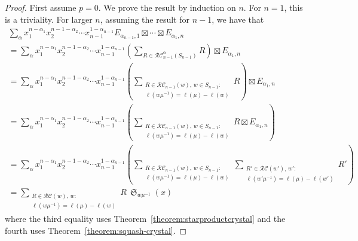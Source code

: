 \documentclass{amsart}
\theoremstyle{definition}
\theoremstyle{remark}
\numberwithin{equation}{section}
\DeclareMathOperator{\sch}{\mathfrak{S}}
\newcommand{\RC}{\mathcal{RC}}
\begin{document}
\begin{proof}
First assume $p=0$. We prove the result by induction on $n$. For $n=1$, this is a triviality. For larger $n$, assuming the result for $n-1$, we have that
\begin{multline*}\sum_{\alpha}x_1^{n - \alpha_1}x_2^{n - 1 - \alpha_2}\cdots x_{n-1}^{1 - \alpha_{n-1}}
E_{\alpha_{n-1},1}\boxtimes  \cdots \boxtimes E_{\alpha_1,n} \\
= \sum_{\alpha}x_1^{n - \alpha_1}x_2^{n - 1 - \alpha_2}\cdots x_{n-1}^{1 - \alpha_{n-1}}
\left(\sum_{R\in \RC^{\alpha}_{n-1}(S_{n-1})}R\right)\boxtimes E_{\alpha_1,n} \\
= \sum_{\alpha}x_1^{n - \alpha_1}x_2^{n - 1 - \alpha_2}\cdots x_{n-1}^{1 - \alpha_{n-1}}
\left(\sum_{\substack{R\in \RC_{n-1}(w),\, w\in S_{n-1}:\\[2pt] \ell(w\mu^{-1})=\ell(\mu)-\ell(w)}}R\right)\boxtimes E_{\alpha_1,n} \\
= \sum_{\alpha}x_1^{n - \alpha_1}x_2^{n - 1 - \alpha_2}\cdots x_{n-1}^{1 - \alpha_{n-1}}
\left(\sum_{\substack{R\in \RC_{n-1}(w),\, w\in S_{n-1}:\\[2pt] \ell(w\mu^{-1})=\ell(\mu)-\ell(w)}}R\boxtimes E_{\alpha_1,n}\right) \\
= \sum_{\alpha}x_1^{n - \alpha_1}x_2^{n - 1 - \alpha_2}\cdots x_{n-1}^{1 - \alpha_{n-1}}
\left(\sum_{\substack{R\in \RC_{n-1}(w),\, w\in S_{n-1}:\\[2pt] \ell(w\mu^{-1})=\ell(\mu)-\ell(w)}}\sum_{\substack{R'\in \RC(w'),\, w':\\[2pt] \ell(w'\mu^{-1})=\ell(\mu)-\ell(w')}}R'\right) \\
= \sum_{\substack{R\in\RC(w),\, w:\\[2pt] \ell(w\mu^{-1})=\ell(\mu)-\ell(w)}}R\,\sch_{w\mu^{-1}}(x)
\end{multline*}
where the third equality uses Theorem~\ref{theorem:starproductcrystal} and the fourth uses Theorem~\ref{theorem:squash-crystal}.


\end{proof}
\end{document}
